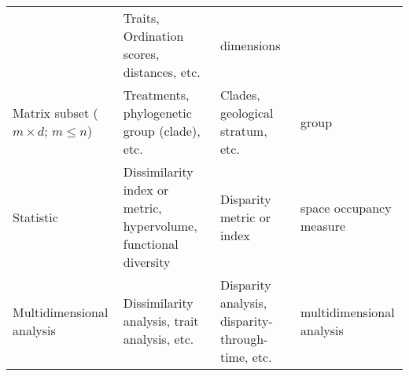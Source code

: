 \documentclass[]{article}
\begin{document}
\begin{longtable}[]{@{}llll@{}}
\begin{minipage}[t]{0.16\columnwidth}
\end{minipage} & \begin{minipage}[t]{0.25\columnwidth}\raggedright\strut
Traits, Ordination scores, distances, etc.\strut
\end{minipage} & \begin{minipage}[t]{0.20\columnwidth}\raggedright\strut
dimensions\strut
\end{minipage}\tabularnewline
\begin{minipage}[t]{0.20\columnwidth}\raggedright\strut
Matrix subset (\(m \times d\); \(m \leq n\))\strut
\end{minipage} & \begin{minipage}[t]{0.16\columnwidth}\raggedright\strut
Treatments, phylogenetic group (clade), etc.\strut
\end{minipage} & \begin{minipage}[t]{0.25\columnwidth}\raggedright\strut
Clades, geological stratum, etc.\strut
\end{minipage} & \begin{minipage}[t]{0.20\columnwidth}\raggedright\strut
group\strut
\end{minipage}\tabularnewline
\begin{minipage}[t]{0.20\columnwidth}\raggedright\strut
Statistic\strut
\end{minipage} & \begin{minipage}[t]{0.16\columnwidth}\raggedright\strut
Dissimilarity index or metric, hypervolume, functional diversity\strut
\end{minipage} & \begin{minipage}[t]{0.25\columnwidth}\raggedright\strut
Disparity metric or index\strut
\end{minipage} & \begin{minipage}[t]{0.20\columnwidth}\raggedright\strut
space occupancy measure\strut
\end{minipage}\tabularnewline
\begin{minipage}[t]{0.20\columnwidth}\raggedright\strut
Multidimensional analysis\strut
\end{minipage} & \begin{minipage}[t]{0.16\columnwidth}\raggedright\strut
Dissimilarity analysis, trait analysis, etc.\strut
\end{minipage} & \begin{minipage}[t]{0.25\columnwidth}\raggedright\strut
Disparity analysis, disparity-through-time, etc.\strut
\end{minipage} & \begin{minipage}[t]{0.20\columnwidth}\raggedright\strut
multidimensional analysis\strut
\end{minipage}\tabularnewline
\bottomrule
\end{longtable}
\end{document}
